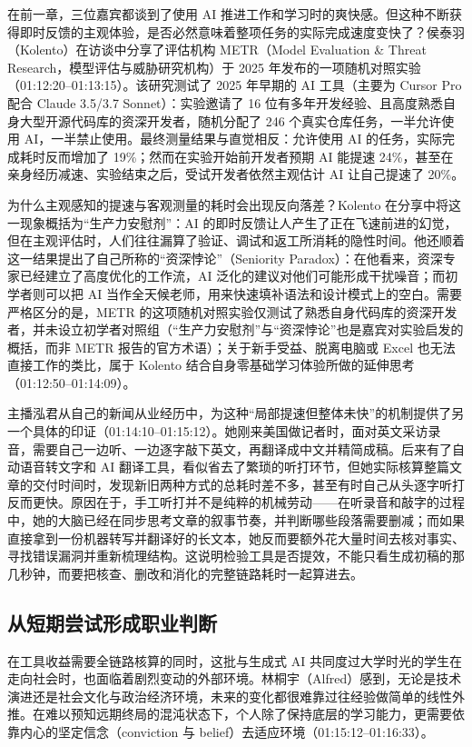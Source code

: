 \documentclass[UTF8,a4paper,11pt,fontset=fandol]{ctexart}
\begin{document}
在前一章，三位嘉宾都谈到了使用 AI 推进工作和学习时的爽快感。但这种不断获得即时反馈的主观体验，是否必然意味着整项任务的实际完成速度变快了？侯泰羽（Kolento）在访谈中分享了评估机构 METR（Model Evaluation \& Threat Research，模型评估与威胁研究机构）于 2025 年发布的一项随机对照实验（01:12:20–01:13:15）。该研究测试了 2025 年早期的 AI 工具（主要为 Cursor Pro 配合 Claude 3.5/3.7 Sonnet）：实验邀请了 16 位有多年开发经验、且高度熟悉自身大型开源代码库的资深开发者，随机分配了 246 个真实仓库任务，一半允许使用 AI，一半禁止使用。最终测量结果与直觉相反：允许使用 AI 的任务，实际完成耗时反而增加了 19\%；然而在实验开始前开发者预期 AI 能提速 24\%，甚至在亲身经历减速、实验结束之后，受试开发者依然主观估计 AI 让自己提速了 20\%。

为什么主观感知的提速与客观测量的耗时会出现反向落差？Kolento 在分享中将这一现象概括为“生产力安慰剂”：AI 的即时反馈让人产生了正在飞速前进的幻觉，但在主观评估时，人们往往漏算了验证、调试和返工所消耗的隐性时间。他还顺着这一结果提出了自己所称的“资深悖论”（Seniority Paradox）：在他看来，资深专家已经建立了高度优化的工作流，AI 泛化的建议对他们可能形成干扰噪音；而初学者则可以把 AI 当作全天候老师，用来快速填补语法和设计模式上的空白。需要严格区分的是，METR 的这项随机对照实验仅测试了熟悉自身代码库的资深开发者，并未设立初学者对照组（“生产力安慰剂”与“资深悖论”也是嘉宾对实验启发的概括，而非 METR 报告的官方术语）；关于新手受益、脱离电脑或 Excel 也无法直接工作的类比，属于 Kolento 结合自身零基础学习体验所做的延伸思考（01:12:50–01:14:09）。

主播泓君从自己的新闻从业经历中，为这种“局部提速但整体未快”的机制提供了另一个具体的印证（01:14:10–01:15:12）。她刚来美国做记者时，面对英文采访录音，需要自己一边听、一边逐字敲下英文，再翻译成中文并精简成稿。后来有了自动语音转文字和 AI 翻译工具，看似省去了繁琐的听打环节，但她实际核算整篇文章的交付时间时，发现新旧两种方式的总耗时差不多，甚至有时自己从头逐字听打反而更快。原因在于，手工听打并不是纯粹的机械劳动——在听录音和敲字的过程中，她的大脑已经在同步思考文章的叙事节奏，并判断哪些段落需要删减；而如果直接拿到一份机器转写并翻译好的长文本，她反而要额外花大量时间去核对事实、寻找错误漏洞并重新梳理结构。这说明检验工具是否提效，不能只看生成初稿的那几秒钟，而要把核查、删改和消化的完整链路耗时一起算进去。

\subsection{从短期尝试形成职业判断}
在工具收益需要全链路核算的同时，这批与生成式 AI 共同度过大学时光的学生在走向社会时，也面临着剧烈变动的外部环境。林桐宇（Alfred）感到，无论是技术演进还是社会文化与政治经济环境，未来的变化都很难靠过往经验做简单的线性外推。在难以预知远期终局的混沌状态下，个人除了保持底层的学习能力，更需要依靠内心的坚定信念（conviction 与 belief）去适应环境（01:15:12–01:16:33）。
\end{document}
